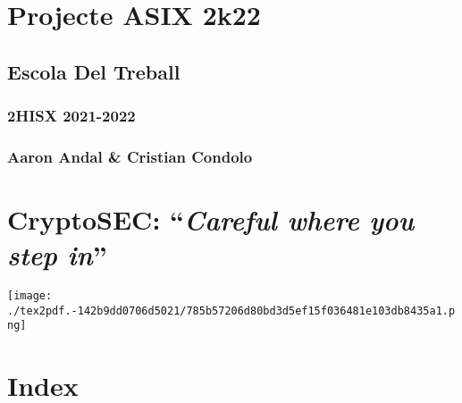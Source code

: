 \documentclass[]{article}
\date{}
\begin{document}
\hypertarget{projecte-asix-2k22}{%
\section{\texorpdfstring{\textbf{Projecte ASIX
2k22}}{Projecte ASIX 2k22}}\label{projecte-asix-2k22}}

\hypertarget{escola-del-treball}{%
\subsection{\texorpdfstring{\textbf{Escola Del
Treball}}{Escola Del Treball}}\label{escola-del-treball}}

\hypertarget{hisx-2021-2022}{%
\subsubsection{\texorpdfstring{\textbf{2HISX
2021-2022}}{2HISX 2021-2022}}\label{hisx-2021-2022}}

\hypertarget{aaron-andal-cristian-condolo}{%
\subsubsection{\texorpdfstring{\textbf{Aaron Andal \& Cristian
Condolo}}{Aaron Andal \& Cristian Condolo}}\label{aaron-andal-cristian-condolo}}

\hypertarget{cryptosec-careful-where-you-step-in}{%
\section{\texorpdfstring{\textbf{CryptoSEC}: ``\emph{Careful where you
step
in}''}{CryptoSEC: ``Careful where you step in''}}\label{cryptosec-careful-where-you-step-in}}

\texttt{[image: ./tex2pdf.-142b9dd0706d5021/785b57206d80bd3d5ef15f036481e103db8435a1.png]}

\hypertarget{index}{%
\section{\texorpdfstring{\textbf{Index}}{Index}}\label{index}}
\end{document}
